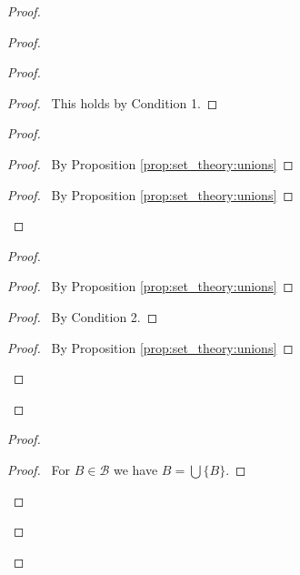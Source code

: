 \begin{proof}
\begin{proof}
\begin{proof}
      \begin{proof}
        \pf\ This holds by Condition 1.
      \end{proof}
      \begin{proof}
        \begin{proof}
          \pf\ By Proposition \ref{prop:set_theory:unions}
        \end{proof}
        \qedstep
        \begin{proof}
          \pf\ By Proposition \ref{prop:set_theory:unions}
        \end{proof}
      \end{proof}
      \begin{proof}
        \begin{proof}
          \pf\ By Proposition \ref{prop:set_theory:unions}
        \end{proof}
        \begin{proof}
          \pf\ By Condition 2.
        \end{proof}
        \qedstep
        \begin{proof}
          \pf\ By Proposition \ref{prop:set_theory:unions}
        \end{proof}
      \end{proof}
    \end{proof}
    \begin{proof}
      \begin{proof}
        \pf\ For $B \in \mathcal{B}$ we have $B = \bigcup \{ B \}$.

\end{proof}
\end{proof}
\end{proof}
\end{proof}
